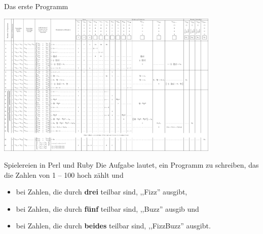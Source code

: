 \begin{frame}{Das erste Programm}
  \begin{center}
    \includegraphics[width=0.8\textwidth]{pics/dasersteprogramm.png}
  \end{center}
\end{frame}

\begin{frame}{Spielereien in Perl und Ruby}
  Die Aufgabe lautet, ein Programm zu schreiben, das die Zahlen von 1 -- 100 hoch zählt und 
  \begin{itemize}
    \item bei Zahlen, die durch \textbf{drei} teilbar sind, ,,Fizz'' ausgibt,
    \item bei Zahlen, die durch \textbf{fünf} teilbar sind, ,,Buzz'' ausgib und
    \item bei Zahlen, die durch \textbf{beides} teilbar sind, ,,FizzBuzz'' ausgibt.
  \end{itemize}
\end{frame}

